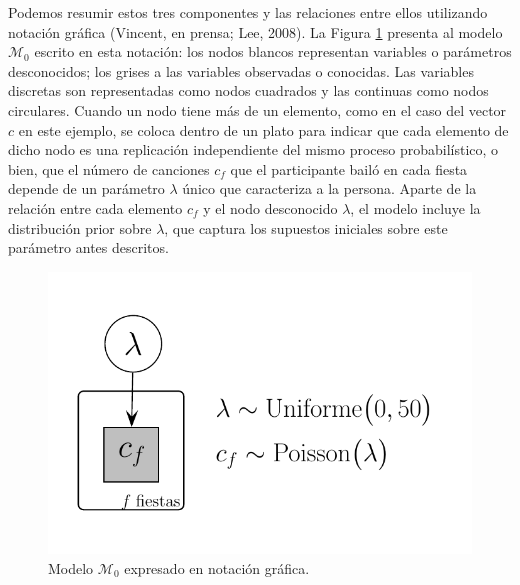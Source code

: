 \documentclass{article}
\begin{document}
\indent Podemos resumir estos tres componentes y las relaciones entre ellos utilizando notación gráfica (Vincent, en prensa; Lee, 2008). La Figura \ref{fig:m_0} presenta al modelo $\mathcal M_0$ escrito en esta notación: los nodos blancos representan variables o parámetros desconocidos; los grises a las variables observadas o conocidas. Las variables discretas son representadas como nodos cuadrados y las continuas como nodos circulares. Cuando un nodo tiene más de un elemento, como en el caso del vector $c$ en este ejemplo, se coloca dentro de un plato para indicar que cada elemento de dicho nodo es una replicación independiente del mismo proceso probabilístico, o bien, que el número de canciones $c_f$ que el participante bailó en cada fiesta depende de un parámetro $\lambda$ único que caracteriza a la persona. Aparte de la relación entre cada elemento $c_f$ y el nodo desconocido $\lambda$, el modelo incluye la distribución prior sobre $\lambda$, que captura los supuestos iniciales sobre este parámetro antes descritos.\\

\begin{figure}[H]
\centerline{\includegraphics[width=.7\textwidth]{m_0.pdf}}
\caption{Modelo $\mathcal M_0$ expresado en notación gráfica.}
\label{fig:m_0}
\end{figure}
\end{document}
